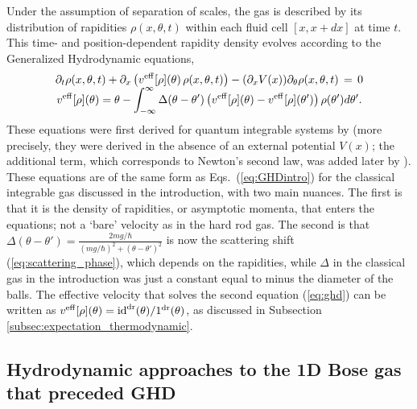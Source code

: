 \documentclass[onecolumn,amsfonts,showpacs,superscriptaddress]{revtex4-1}
\begin{document}
Under the assumption of separation of scales, the gas is described by its distribution of rapidities $\rho(x,\theta,t)$ within each fluid cell $[x,x+dx]$ at time $t$. This time- and position-dependent rapidity density evolves according to the Generalized Hydrodynamic equations,
\begin{equation}
    \label{eq:ghd}
    \begin{array}{c}
       \displaystyle \partial_t \rho(x,\theta,t) + \partial_x \left( v^{\rm eff}[\rho] (\theta) \, \rho(x,\theta,t) \right) - (\partial_x V(x)) \partial_\theta \rho(x,\theta,t)  \, = \, 0 \\
       \displaystyle v^{\rm eff}[\rho] (\theta) = \theta - \int_{-\infty}^\infty \Delta(\theta- \theta')  \left(  v^{\rm eff}[\rho] (\theta)  - v^{\rm eff}[\rho] (\theta') \right) \rho(\theta') d\theta' .
    \end{array}
\end{equation}
These equations were first derived for quantum integrable systems by \cite{castro2016emergent,bertini2016transport} (more precisely, they were derived in the absence of an external potential $V(x)$; the additional term, which corresponds to Newton's second law, was added later by \cite{doyon2017note}). These equations are of the same form as Eqs.~(\ref{eq:GHDintro}) for the classical integrable gas discussed in the introduction, with two main nuances. The first is that it is the density of rapidities, or asymptotic momenta, that enters the equations; not a `bare' velocity as in the hard rod gas. The second is that $\Delta(\theta-\theta') = \frac{2mg/\hbar}{(m g/\hbar)^2 + (\theta - \theta')^2}$ is now the scattering shift (\ref{eq:scattering_phase}), which depends on the rapidities,  while $\Delta$ in the classical gas in the introduction was just a constant equal to minus the diameter of the balls. The effective velocity that solves the second equation (\ref{eq:ghd}) can be written as $v^{\rm eff}[\rho](\theta) = {\rm id}^{\rm dr}(\theta)/1^{\rm dr}(\theta)$, as discussed in Subsection \ref{subsec:expectation_thermodynamic}.






\subsection{Hydrodynamic approaches to the 1D Bose gas that preceded GHD}
\label{subsec:conventional_hydro}
\end{document}
